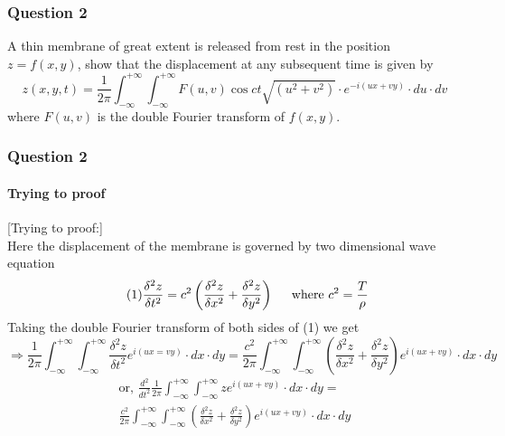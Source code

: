 \documentclass[9 pt]{beamer}
\begin{document}
\begin{frame}[fragile]
\frametitle{Question 2}
\begin{block}{2}
A thin membrane of great extent is released from rest in the position $z=f(x,y)$, show that the displacement at any subsequent time is given by
$$z(x,y,t)=\frac{1}{2\pi}\int_{-\infty}^{+\infty}\int_{-\infty}^{+\infty}F(u,v)\cos ct\sqrt{(u^2+v^2)}\cdot e^{-i(ux+vy)}\cdot du\cdot dv$$
where $F(u,v)$ is the double Fourier transform of $f(x,y)$.
\end{block}

\transfade[duration=0.6]
\end{frame}

\begin{frame}[fragile]
\frametitle{Question 2}
\framesubtitle{Trying to proof}
[Trying to proof:] \\
Here the displacement of the membrane is governed by two dimensional wave equation
\begin{equation} \tag{1}
\frac{\delta^2z}{\delta t^2}=c^2\left(\frac{\delta^2z}{\delta x^2}+\frac{\delta^2z}{\delta y^2}\right) \hspace{0.5cm}\textrm{where }c^2=\frac{T}{\rho}
\end{equation}
Taking the double Fourier transform of both sides of (1) we get
\begin{displaymath}
\Rightarrow\frac{1}{2\pi}\int_{-\infty}^{+\infty}\int_{-\infty}^{+\infty}\frac{\delta^2z}{\delta t^2}e^{i(ux=vy)}\cdot dx\cdot dy = \frac{c^2}{2\pi}\int_{-\infty}^{+\infty}\int_{-\infty}^{+\infty}\left(\frac{\delta^2z}{\delta x^2}+\frac{\delta^2z}{\delta y^2}\right)e^{i(ux+vy)}\cdot dx\cdot dy 
\end{displaymath}
\begin{multline*}
\textrm{or, } \frac{d^2}{dt^2} \frac{1}{2\pi}\int_{-\infty}^{+\infty}\int_{-\infty}^{+\infty}ze^{i(ux+vy)}\cdot dx\cdot dy= \\ \frac{c^2}{2\pi}\int_{-\infty}^{+\infty}\int_{-\infty}^{+\infty}\left(\frac{\delta^2z}{\delta x^2}+\frac{\delta^2z}{\delta y^2}\right)e^{i(ux+vy)}\cdot dx\cdot dy
\end{multline*}

\transwipe[duration=0.6]
\end{frame}
\end{document}
